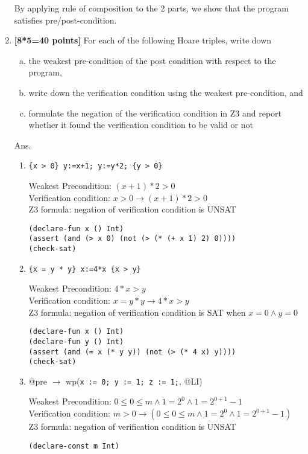 \documentclass{article}
\begin{document}
\begin{enumerate}
By applying rule of composition to the 2 parts, we show that the program satisfies pre/post-condition.

\item \textbf{[8*5=40 points]}
For each of the following Hoare triples, write down
\begin{enumerate}[(a)]
\item the weakest pre-condition of the post condition with respect to the program,
\item write down the verification condition using the weakest pre-condition, and
\item formulate the negation of the verification condition in Z3 and report whether it found the verification condition to be valid or not
\end{enumerate}

\medskip
Ans.
\medskip

\begin{enumerate}[(1)]
    \item \verb|{x > 0} y:=x+1; y:=y*2; {y > 0}|

        Weakest Precondition: $(x+1)*2 > 0$ \\
        Verification condition: $x > 0 \to (x+1)*2 > 0$ \\
        Z3 formula: negation of verification condition is UNSAT
\begin{verbatim}
(declare-fun x () Int)
(assert (and (> x 0) (not (> (* (+ x 1) 2) 0))))
(check-sat)
\end{verbatim}
        
    \item \verb|{x = y * y} x:=4*x {x > y}|

        Weakest Precondition: $4*x > y$ \\
        Verification condition: $x = y*y \to 4*x > y$ \\
        Z3 formula: negation of verification condition is SAT when $x=0 \land y=0$
\begin{verbatim}
(declare-fun x () Int)
(declare-fun y () Int)
(assert (and (= x (* y y)) (not (> (* 4 x) y))))
(check-sat)
\end{verbatim}

\item @pre $\to$ wp(\verb|x := 0; y := 1; z := 1;|, @LI)

        Weakest Precondition: $0 \leq 0 \leq m \land 1 = 2^0 \land 1 = 2^{0 + 1} - 1$ \\
        Verification condition: $m > 0 \to (0 \leq 0 \leq m \land 1 = 2^0 \land 1 = 2^{0 + 1} - 1)$ \\
        Z3 formula: negation of verification condition is UNSAT
\begin{verbatim}
(declare-const m Int)


\end{verbatim}
\end{enumerate}
\end{enumerate}
\end{document}
